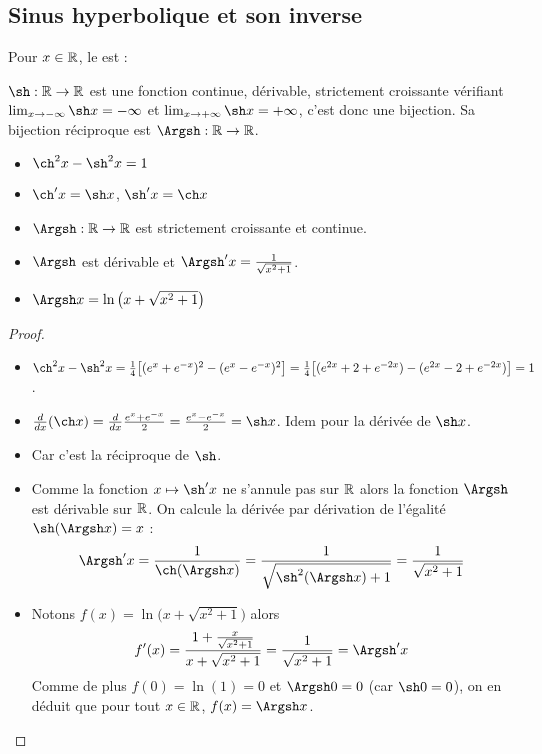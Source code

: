 \documentclass[class=report,crop=false]{standalone}
\begin{document}



\subsection{Sinus hyperbolique et son inverse}

Pour $x\in \mathbb{R}$, le  est :

$\sh : \Rr \to \Rr$ est une fonction continue, dérivable, strictement
croissante vérifiant $\lim_{x\to -\infty} \sh x = -\infty$
et $\lim_{x\to +\infty} \sh x = +\infty$, c'est donc une bijection.
Sa bijection réciproque est $\Argsh : \Rr \to \Rr$.

\begin{proposition}
\sauteligne
\begin{itemize}
  \item $\ch^2 x - \sh^2 x =1$
  \item $\ch' x = \sh x$, $\sh'x = \ch x$
  \item $\Argsh : \Rr \to \Rr$ est strictement croissante et continue.
  \item $\Argsh$ est dérivable  et $\Argsh'x=\frac{1}{\sqrt{x^2+1}}$.
  \item $\Argsh x = \ln\big(x+ \sqrt{x^2+1}\big)$
\end{itemize}
\end{proposition}




\begin{proof}~
\begin{itemize}
  \item $\ch^2 x- \sh^2 x = \frac14 \big[ (e^x+e^{-x})^2 - (e^x-e^{-x})^2 \big] =
 \frac14 \big[ (e^{2x}+2+e^{-2x}) - (e^{2x}-2+e^{-2x})  \big] = 1$.

  \item $\frac{d}{dx}(\ch x) = \frac{d}{dx} \frac{e^x+e^{-x}}{2} = \frac{e^x-e^{-x}}{2}  = \sh x$.
Idem pour la dérivée de $\sh x$.

  \item Car c'est la réciproque de $\sh$.

  \item Comme la fonction $x \mapsto \sh'x$  ne s'annule pas sur $\mathbb{R}$
alors la fonction $\Argsh$ est dérivable sur $\mathbb{R}$.
On calcule la dérivée par dérivation de l'égalité $\sh(\Argsh x) = x$ :
$$\Argsh' x = \frac{1}{\ch(\Argsh x)} = \frac{1}{\sqrt{\sh^2(\Argsh x)+1}}
= \frac{1}{\sqrt{x^2+1}}$$

  \item Notons $f(x)=\ln\big(x+ \sqrt{x^2+1}\big)$ alors
   $$f'(x) = \frac{1+\frac{x}{\sqrt{x^2+1}}}{x+ \sqrt{x^2+1}} = \frac{1}{\sqrt{x^2+1}} = \Argsh' x$$
  Comme de plus $f(0)=\ln(1)=0$ et $\Argsh 0 = 0$ (car $\sh 0 = 0$), on en déduit que pour tout
  $x\in \mathbb{R}$, $f(x) = \Argsh x$.
 \end{itemize}


\end{proof}
\end{document}
